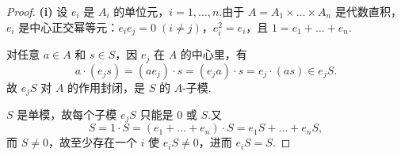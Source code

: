 \documentclass[11pt,a4paper]{article}
\theoremstyle{plain}
\theoremstyle{definition}
\begin{document}
\begin{proof}
\noindent \textbf{(i)} 设 $e_i$ 是 $A_i$ 的单位元，$i = 1, \dots, n$.由于 $A = A_1 \times \dots \times A_n$ 是代数直积，$e_i$ 是中心正交幂等元：$e_i e_j = 0\;(i \neq j)$，$e_i^2 = e_i$，且 $1 = e_1 + \dots + e_n$.\par
\noindent{} 对任意 $a \in A$ 和 $s \in S$，因 $e_j$ 在 $A$ 的中心里，有
\[
a \cdot (e_j s) = (a e_j) \cdot s = (e_j a) \cdot s = e_j \cdot (a s) \in e_j S.
\]
故 $e_j S$ 对 $A$ 的作用封闭，是 $S$ 的 $A$-子模.\par
\noindent {} $S$ 是单模，故每个子模 $e_j S$ 只能是 $0$ 或 $S$.又
\[
S = 1 \cdot S = (e_1 + \dots + e_n) \cdot S = e_1 S + \dots + e_n S,
\]
而 $S \neq 0$，故至少存在一个 $i$ 使 $e_i S \neq 0$，进而 $e_i S = S$.


\end{proof}
\end{document}
